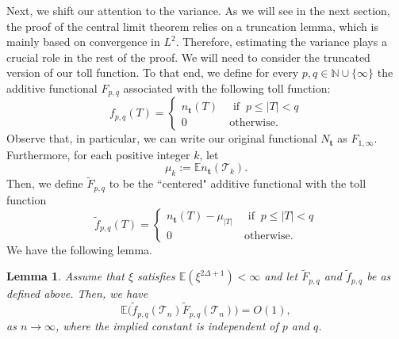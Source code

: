 \documentclass[article]{amsart}
\newcommand{\tc}{\mathcal{T}}
\newcommand{\st}{\textbf{t}}
\newcommand{\N}{N_{\st}}
\newcommand{\n}{n_{\st}}
\newcommand{\hf}{\tilde{f}_{p,q}}
\newcommand{\hF}{\tilde{F}_{p,q}}
\newcommand{\E}{\mathbb{E}}
\newtheorem{lemma}[theorem]{Lemma}
\theoremstyle{definition}
\theoremstyle{remark}
\begin{document}
Next, we shift our attention to the variance. As we will see in the next section, the proof of the central limit theorem relies on a truncation lemma, which is mainly based on convergence in \(L^2\). Therefore, estimating the variance plays a crucial role in the rest of the proof. We will need to consider the truncated version of our toll function. To that end, we define for every $p,q\in \mathbb{N}\cup \{\infty\}$  the additive functional $F_{p,q}$ associated with the following toll function: 
\[
f_{p,q}(T)=
\begin{cases}
    \n(T)\ &\text{ if }\  p \leq |T|<q \\
    0\ &\text{otherwise}.
\end{cases}
\]
Observe that, in particular, we can write our original functional $\N$ as $F_{1,\infty}$. Furthermore, for each positive integer $k$, let 
\[
\mu_k:=\mathbb E \n(\tc_k).
\]
Then, we define $\hF$ to be the ``centered" additive functional with the toll function 
\[
\hf(T)=\begin{cases}
    \n(T)-\mu_{|T|}\ &\text{ if }\  p \leq |T|<q \\
    0\ &\text{otherwise}.
\end{cases}
\]
We have the following lemma.
\begin{lemma}\label{lem:toll_add}
	Assume that $\xi$ satisfies $\mathbb{E}(\xi^{2\Delta+1})<\infty$ and let $\hF$ and $\hf$ be as defined above. Then, we have
	\begin{equation}
	\E\big(\hf(\tc_n)\hF(\tc_n)\big)=O(1),
	\end{equation}
 as $n\to\infty$, where the implied constant is independent of $p$ and $q$.
\end{lemma}
\end{document}
